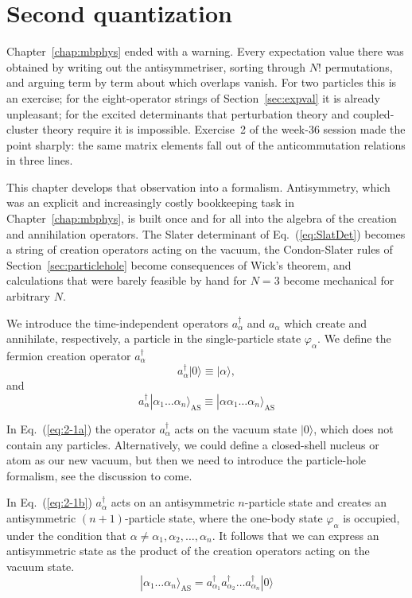 \chapter{Second quantization}
\label{chap:secondquant}

Chapter~\ref{chap:mbphys} ended with a warning.  Every expectation value there
was obtained by writing out the antisymmetriser, sorting through $N!$
permutations, and arguing term by term about which overlaps vanish.  For two
particles this is an exercise; for the eight-operator strings of
Section~\ref{sec:expval} it is already unpleasant; for the excited
determinants that perturbation theory and coupled-cluster theory require it is
impossible.  Exercise~2 of the week-36 session made the point sharply: the
same matrix elements fall out of the anticommutation relations in three lines.

This chapter develops that observation into a formalism.  Antisymmetry, which
was an explicit and increasingly costly bookkeeping task in
Chapter~\ref{chap:mbphys}, is built once and for all into the algebra of the
creation and annihilation operators.  The Slater determinant of
Eq.~(\ref{eq:SlatDet}) becomes a string of creation operators acting on the
vacuum, the Condon-Slater rules of Section~\ref{sec:particlehole} become
consequences of Wick's theorem, and calculations that were barely feasible by
hand for $N=3$ become mechanical for arbitrary $N$.

We introduce the time-independent  operators
$a_\alpha^{\dagger}$ and $a_\alpha$   which create and annihilate, respectively, a particle 
in the single-particle state 
$\varphi_\alpha$. 
We define the fermion creation operator
$a_\alpha^{\dagger}$ 
\begin{equation}
	a_\alpha^{\dagger}|0\rangle \equiv  |\alpha\rangle  \label{eq:2-1a},
\end{equation}
and
\begin{equation}
	a_\alpha^{\dagger}|\alpha_1\dots \alpha_n\rangle_{\mathrm{AS}} \equiv  |\alpha\alpha_1\dots \alpha_n\rangle_{\mathrm{AS}} \label{eq:2-1b}
\end{equation}

In Eq.~(\ref{eq:2-1a}) 
the operator  $a_\alpha^{\dagger}$  acts on the vacuum state 
$|0\rangle$, which does not contain any particles. Alternatively, we could define  a closed-shell nucleus or atom as our new vacuum, but then
we need to introduce the particle-hole  formalism, see the discussion to come. 

In Eq.~(\ref{eq:2-1b}) $a_\alpha^{\dagger}$ acts on an antisymmetric $n$-particle state and 
creates an antisymmetric $(n+1)$-particle state, where the one-body state 
$\varphi_\alpha$ is occupied, under the condition that
$\alpha \ne \alpha_1, \alpha_2, \dots, \alpha_n$. 
It follows that we can express an antisymmetric state as the product of the creation
operators acting on the vacuum state.  
\begin{equation}
	|\alpha_1\dots \alpha_n\rangle_{\mathrm{AS}} = a_{\alpha_1}^{\dagger} a_{\alpha_2}^{\dagger} \dots a_{\alpha_n}^{\dagger} |0\rangle \label{eq:2-2}
\end{equation}

